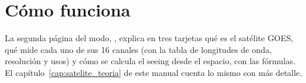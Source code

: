 \section{Cómo funciona}

La segunda página del modo, , explica en tres tarjetas qué es el satélite GOES, qué mide cada uno de
sus 16 canales (con la tabla de longitudes de onda, resolución y usos) y cómo se calcula el seeing desde el espacio, con
las fórmulas. El capítulo~\ref{cap:satelite_teoria} de este manual cuenta lo mismo con más detalle.

